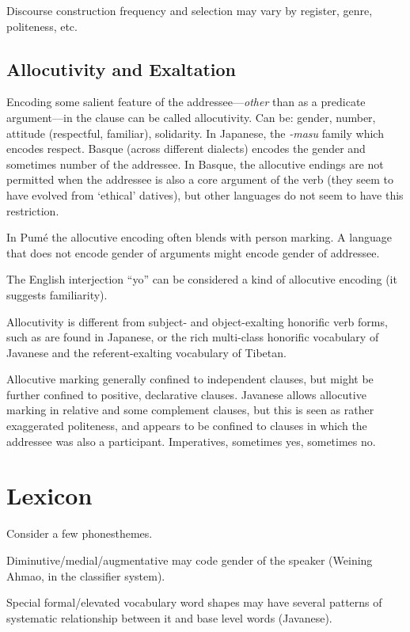 \documentclass[11pt]{article}
\begin{document}
{Discourse construction frequency and selection may vary by register,
genre, politeness, etc. 

\subsection{Allocutivity and Exaltation} Encoding some salient feature
of the addressee---\textit{other} than as a predicate argument---in
the clause can be called allocutivity.  Can be: gender, number,
attitude (respectful, familiar), solidarity.  In Japanese, the
\textit{-masu} family which encodes respect.  Basque (across different
dialects) encodes the gender and sometimes number of the addressee.
In Basque, the allocutive endings are not permitted when the addressee
is also a core argument of the verb (they seem to have evolved from
`ethical' datives), but other languages do not seem to have this
restriction.

In Pumé the allocutive encoding often blends with person marking.  A
language that does not encode gender of arguments might encode gender
of addressee.

The English interjection ``yo'' can be considered a kind of allocutive
encoding (it suggests familiarity).

Allocutivity is different from subject- and object-exalting honorific
verb forms, such as are found in Japanese, or the rich multi-class
honorific vocabulary of Javanese and the referent-exalting vocabulary
of Tibetan.

Allocutive marking generally confined to independent clauses, but
might be further confined to positive, declarative clauses.  Javanese
allows allocutive marking in relative and some complement clauses, but
this is seen as rather exaggerated politeness, and appears to be
confined to clauses in which the addressee was also a participant.
Imperatives, sometimes yes, sometimes no.



\section{Lexicon}
Consider a few phonesthemes.

Diminutive/medial/augmentative may code gender of the speaker (Weining
Ahmao, in the classifier system).

Special formal/elevated vocabulary word shapes may have several
patterns of systematic relationship between it and base level words
(Javanese).

}
\end{document}
